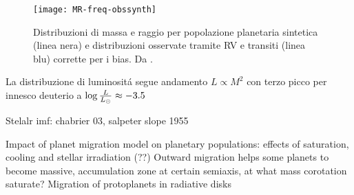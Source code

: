 \begin{figure}[!ht]\texttt{[image: MR-freq-obssynth]}\caption{Distribuzioni di massa e raggio per popolazione planetaria sintetica (linea nera) e distribuzioni osservate tramite RV e transiti (linea blu) corrette per i bias. Da \cite{mordasini2018planetary}.}\label{fig:MR-freq-obssynth}
\end{figure}

\begin{workout}
	La distribuzione di luminosit\'a segue andamento $L\propto M^2$ con terzo picco per innesco deuterio a $\log{\frac{L}{L_{\odot}}}\approx-3.5$
\end{workout}

\begin{workout}[Relazione $M_p$ vs $Z_p$]
	
\end{workout}

\begin{workout}
	
\end{workout}

\begin{workout}

\end{workout}

\begin{workout}
Stelalr imf: chabrier 03, salpeter slope 1955
\end{workout}




\begin{workout}
Impact of planet migration model on planetary populations: effects of saturation, cooling and stellar irradiation (??)
Outward migration helps some planets to become massive, accumulation zone at certain semiaxis, at what mass corotation saturate?
Migration of protoplanets in radiative disks
\end{workout}
